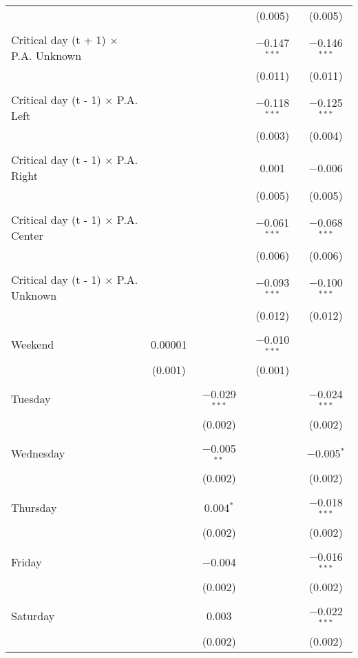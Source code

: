 \documentclass[
]{article}
\begin{document}
\begin{table}[!htbp]
{\begin{tabular}{@{\extracolsep{5pt}}lcccc}
  &  &  & (0.005) & (0.005) \\ 
  & & & & \\ 
 Critical day (t + 1) $\times$ P.A. Unknown &  &  & $-$0.147$^{***}$ & $-$0.146$^{***}$ \\ 
  &  &  & (0.011) & (0.011) \\ 
  & & & & \\ 
 Critical day (t - 1) $\times$ P.A. Left &  &  & $-$0.118$^{***}$ & $-$0.125$^{***}$ \\ 
  &  &  & (0.003) & (0.004) \\ 
  & & & & \\ 
 Critical day (t - 1) $\times$ P.A. Right &  &  & 0.001 & $-$0.006 \\ 
  &  &  & (0.005) & (0.005) \\ 
  & & & & \\ 
 Critical day (t - 1) $\times$ P.A. Center &  &  & $-$0.061$^{***}$ & $-$0.068$^{***}$ \\ 
  &  &  & (0.006) & (0.006) \\ 
  & & & & \\ 
 Critical day (t - 1) $\times$ P.A. Unknown &  &  & $-$0.093$^{***}$ & $-$0.100$^{***}$ \\ 
  &  &  & (0.012) & (0.012) \\ 
  & & & & \\ 
 Weekend & 0.00001 &  & $-$0.010$^{***}$ &  \\ 
  & (0.001) &  & (0.001) &  \\ 
  & & & & \\ 
 Tuesday &  & $-$0.029$^{***}$ &  & $-$0.024$^{***}$ \\ 
  &  & (0.002) &  & (0.002) \\ 
  & & & & \\ 
 Wednesday &  & $-$0.005$^{**}$ &  & $-$0.005$^{*}$ \\ 
  &  & (0.002) &  & (0.002) \\ 
  & & & & \\ 
 Thursday &  & 0.004$^{*}$ &  & $-$0.018$^{***}$ \\ 
  &  & (0.002) &  & (0.002) \\ 
  & & & & \\ 
 Friday &  & $-$0.004 &  & $-$0.016$^{***}$ \\ 
  &  & (0.002) &  & (0.002) \\ 
  & & & & \\ 
 Saturday &  & 0.003 &  & $-$0.022$^{***}$ \\ 
  &  & (0.002) &  & (0.002) \\ 

\end{tabular}}
\end{table}
\end{document}
